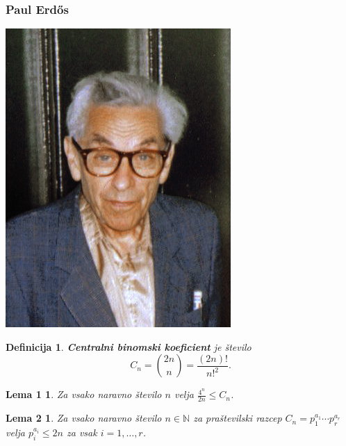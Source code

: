 \documentclass{beamer}
\newtheorem{definicija}{Definicija}
\newtheorem{lema1}{Lema 1}
\newtheorem{lema2}{Lema 2}
\def\N{\mathbb{N}}
\begin{document}

\begin{frame}
    \frametitle{Paul Erd\H{o}s}
    \centering
    \includegraphics[height=0.8\textheight]{erdos.jpg}
\end{frame}


\begin{frame}
    \begin{definicija} %
        \textbf{Centralni binomski koeficient} je število $$C_n = \binom{2n}{n} = \frac{(2n)!}{n!^2}.$$
    \end{definicija}
    \pause
    \medskip
    \begin{lema1}
        \label{lema1}
        Za vsako naravno število $n$ velja $\frac{4^n}{2n} \leq C_n$.
    \end{lema1}
    \pause
    \medskip
    \begin{lema2}
        \label{lema2}
        Za vsako naravno število $n \in \N$ za praštevilski razcep $C_n = p_1^{a_1} \cdots p_r^{a_r}$ velja $p_i^{a_i} \leq 2n$ za vsak $i = 1,\ldots,r$. 
    \end{lema2}
\end{frame}

\end{document}
